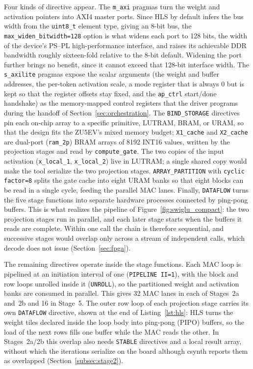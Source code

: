 Four kinds of directive appear. The \texttt{m\_axi} pragmas turn the weight and
activation pointers into AXI4 master ports. Since HLS by default infers the bus width
from the \texttt{uint8\_t} element type, giving an 8-bit bus, the
\texttt{max\_widen\_bitwidth=128} option is what widens each port to 128 bits, the width
of the device's PS--PL high-performance interface, and raises its achievable DDR
bandwidth roughly sixteen-fold relative to the 8-bit default. Widening the port further brings no benefit, since it cannot exceed that 128-bit interface width. 
The \texttt{s\_axilite} pragmas expose the
scalar arguments (the weight and buffer addresses, the per-token activation scale, a
mode register that is always 0 but is kept so that the register offsets stay fixed, and
the \texttt{ap\_ctrl} start/done handshake) as the memory-mapped control
registers that the driver programs during the handoff of
Section~\ref{sec:orchestration}. The \texttt{BIND\_STORAGE} directives pin each on-chip
array to a specific primitive, LUTRAM, BRAM, or URAM, so that the design fits the
ZU5EV's mixed memory budget; \texttt{X1\_cache} and \texttt{X2\_cache} are dual-port
(\texttt{ram\_2p}) BRAM arrays of 8192 INT16 values, written by the projection stages and
read by \texttt{compute\_gate}. The two copies of the input activation
(\texttt{x\_local\_1}, \texttt{x\_local\_2}) live in LUTRAM; a single shared copy would make
the tool serialize the two projection stages. \texttt{ARRAY\_PARTITION} with
\texttt{cyclic factor=8} splits the gate cache into eight URAM banks so that eight blocks
can be read in a single cycle, feeding the parallel MAC lanes. Finally, \texttt{DATAFLOW} turns the five stage
functions into separate hardware processes connected by ping-pong buffers. This is what
realizes the pipeline of Figure~\ref{fig:swiglu_compact}: the two projection stages run
in parallel, and each later stage starts when the buffers it reads are complete. Within
one call the chain is therefore sequential, and successive stages would overlap only
across a stream of independent calls, which decode does not issue
(Section~\ref{sec:fpga}).

The remaining directives operate inside the stage functions. Each MAC loop is pipelined
at an initiation interval of one (\texttt{PIPELINE II=1}), with the block and row loops
unrolled inside it (\texttt{UNROLL}), so the partitioned weight and activation banks are
consumed in parallel. This gives 32 MAC lanes in each of Stages~2a and~2b and 16 in
Stage~5. The outer row loop of each projection stage carries its own \texttt{DATAFLOW}
directive, shown at the end of Listing~\ref{lst:hls}: HLS turns the weight tiles declared
inside the loop body into ping-pong (PIPO) buffers, so the load of the next rows fills
one buffer while the MAC reads the other. In Stages~2a/2b this overlap also needs
\texttt{STABLE} directives and a local result array, without which the iterations
serialize on the board although csynth reports them as overlapped
(Section~\ref{subsec:stage2}).


